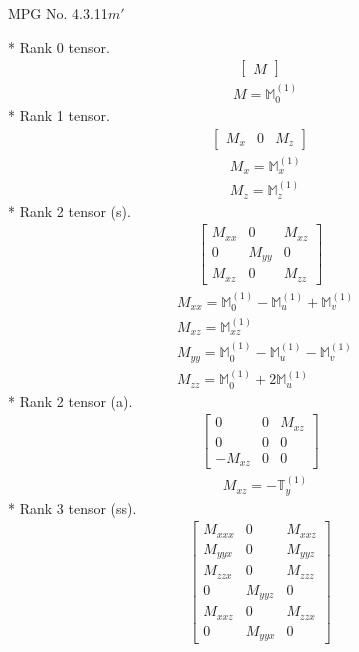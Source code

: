 \documentclass[fleqn,8pt,landscape]{jsarticle}
\begin{document}
\setcounter{MaxMatrixCols}{32}

\renewcommand{\tablename}{Table~}
\renewcommand{\figurename}{Figure~}
\begin{center}
\LARGE
MPG No. 4.3.11\quad$m'$
\end{center}
* Rank 0 tensor.
\begin{align*}
\begin{bmatrix} M \end{bmatrix}
\end{align*}
\begin{align*}
& M = \mathbb{M}_{0}^{(1)}
\end{align*}
* Rank 1 tensor.
\begin{align*}
\begin{bmatrix} M_{x} & 0 & M_{z} \end{bmatrix}
\end{align*}
\begin{align*}
& M_{x} = \mathbb{M}_{x}^{(1)} \\
& M_{z} = \mathbb{M}_{z}^{(1)}
\end{align*}
* Rank 2 tensor (s).
\begin{align*}
\begin{bmatrix} M_{xx} & 0 & M_{xz} \\ 0 & M_{yy} & 0 \\ M_{xz} & 0 & M_{zz} \end{bmatrix}
\end{align*}
\begin{align*}
& M_{xx} = \mathbb{M}_{0}^{(1)} - \mathbb{M}_{u}^{(1)} + \mathbb{M}_{v}^{(1)} \\
& M_{xz} = \mathbb{M}_{xz}^{(1)} \\
& M_{yy} = \mathbb{M}_{0}^{(1)} - \mathbb{M}_{u}^{(1)} - \mathbb{M}_{v}^{(1)} \\
& M_{zz} = \mathbb{M}_{0}^{(1)} + 2 \mathbb{M}_{u}^{(1)}
\end{align*}
* Rank 2 tensor (a).
\begin{align*}
\begin{bmatrix} 0 & 0 & M_{xz} \\ 0 & 0 & 0 \\ - M_{xz} & 0 & 0 \end{bmatrix}
\end{align*}
\begin{align*}
& M_{xz} = - \mathbb{T}_{y}^{(1)}
\end{align*}
* Rank 3 tensor (ss).
\begin{align*}
\begin{bmatrix} M_{xxx} & 0 & M_{xxz} \\ M_{yyx} & 0 & M_{yyz} \\ M_{zzx} & 0 & M_{zzz} \\ 0 & M_{yyz} & 0 \\ M_{xxz} & 0 & M_{zzx} \\ 0 & M_{yyx} & 0 \end{bmatrix}
\end{align*}
\end{document}
